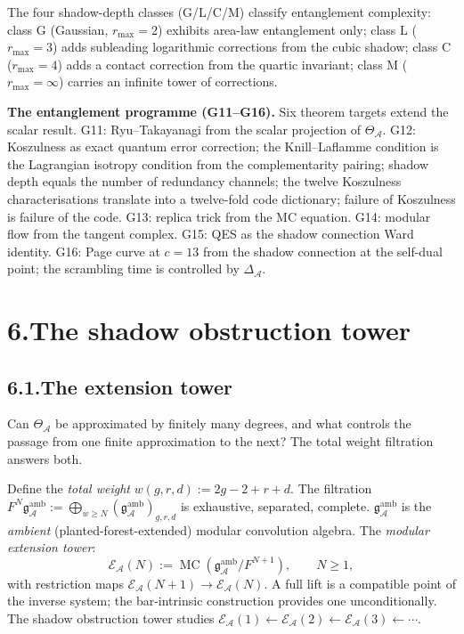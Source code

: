 \documentclass[11pt,reqno]{amsart}
\theoremstyle{definition}
\theoremstyle{remark}
\providecommand{\cA}{\mathcal{A}}
\providecommand{\cE}{\mathcal{E}}
\numberwithin{equation}{section}
\begin{document}
The four shadow-depth classes (G/L/C/M) classify entanglement
complexity: class G (Gaussian, $r_{\max}=2$) exhibits area-law
entanglement only; class L ($r_{\max}=3$) adds subleading logarithmic
corrections from the cubic shadow; class C ($r_{\max}=4$) adds a
contact correction from the quartic invariant; class M
($r_{\max}=\infty$) carries an infinite tower of corrections.

\medskip
\noindent\textbf{The entanglement programme (G11--G16).}\enspace
Six theorem targets extend the scalar result. G11: Ryu--Takayanagi
from the scalar projection of $\Theta_\cA$. G12: Koszulness as exact
quantum error correction; the Knill--Laflamme condition is the
Lagrangian isotropy condition from the complementarity pairing;
shadow depth equals the number of redundancy channels; the twelve
Koszulness characterisations translate into a twelve-fold code
dictionary; failure of Koszulness is failure of the code. G13:
replica trick from the MC equation. G14: modular flow from the
tangent complex. G15: QES as the shadow connection Ward identity.
G16: Page curve at $c=13$ from the shadow connection at the self-dual
point; the scrambling time is controlled by $\Delta_\cA$.


\section*{6.\quad The shadow obstruction tower}

\subsection*{6.1.\enspace The extension tower}

Can $\Theta_\cA$ be approximated by finitely many degrees, and what
controls the passage from one finite approximation to the next? The
total weight filtration answers both.

Define the \emph{total weight} $w(g,r,d):=2g-2+r+d$. The filtration
$F^N\mathfrak g^{\mathrm{amb}}_\cA:=\bigoplus_{w\ge N}(\mathfrak g^{\mathrm{amb}}_\cA)_{g,r,d}$
is exhaustive, separated, complete. $\mathfrak g^{\mathrm{amb}}_\cA$
is the \emph{ambient} (planted-forest-extended) modular convolution
algebra. The \emph{modular extension tower}:
\[
\cE_\cA(N):=\operatorname{MC}(\mathfrak g^{\mathrm{amb}}_\cA/F^{N+1}),\qquad N\ge 1,
\]
with restriction maps $\cE_\cA(N+1)\to\cE_\cA(N)$. A full lift is a
compatible point of the inverse system; the bar-intrinsic construction
provides one unconditionally. The shadow obstruction tower studies
$\cE_\cA(1)\leftarrow\cE_\cA(2)\leftarrow\cE_\cA(3)\leftarrow\cdots$.
\end{document}
